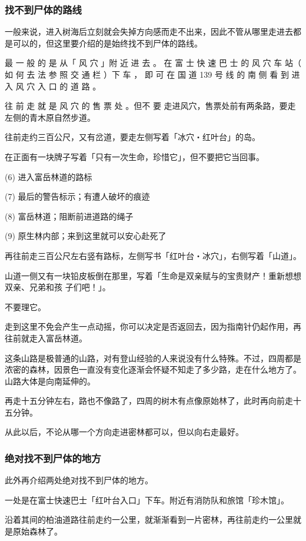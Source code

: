 \documentclass[UTF8]{ctexart}
\begin{document}
\subsubsection*{找不到尸体的路线}

一般来说，进入树海后立刻就会失掉方向感而走不出来，因此不管从哪里走进去都是可以的，但这里要介绍的是始终找不到尸体的路线。

最 一 般 的 是 从「 风 穴 」附 近 进 去 。
在 富 士 快 速 巴 士 的 风 穴 车 站（ 如 何 去 法 参 照 交 通 栏 ）下 车 ， 即 可 在 国 道 139 号 线 的 南 侧 看 到 进 入 风 穴 入 口 的 道 路 。

往 前 走 就 是 风 穴 的 售 票 处 。但不 要 走进风穴，售票处前有两条路，要走左侧的青木原自然步道。 

往前走约三百公尺，又有岔道，要走左侧写着「冰穴‧红叶台」的岛。

在正面有一块牌子写着「只有一次生命，珍惜它」，但不要把它当回事。

(6) 进入富岳林道的路标

(7) 最后的警告标示；有遭人破坏的痕迹

(8) 富岳林道；阻断前进道路的绳子

(9) 原生林内部；来到这里就可以安心赴死了

再往前走三百公尺左右竖有路标，左侧写书「红叶台‧冰穴」，右侧写着「山道」。

山道一侧又有一块铅皮板倒在那里，写着「生命是双亲赋与的宝贵财产！重新想想双亲、兄弟和孩
子们吧！」。

不要理它。

走到这里不免会产生一点动摇，你可以决定是否返回去，因为指南针仍起作用，再往前就走入富岳林道。

这条山路是极普通的山路，对有登山经验的人来说没有什么特殊。不过，四周都是浓密的森林，因景色一直没有变化逐渐会怀疑不知走了多少路，走在什么地方了。山路大体是向南延伸的。

再走十五分钟左右，路也不像路了，四周的树木有点像原始林了，此时再向前走十五分钟。

从此以后，不论从哪一个方向走进密林都可以，但以向右走最好。

\subsubsection*{绝对找不到尸体的地方}

此外再介绍两处绝对找不到尸体的地方。

一处是在富士快速巴士「红叶台入口」下车。附近有消防队和旅馆「珍木馆」。

沿着其间的柏油道路往前走约一公里，就渐渐看到一片密林，再往前走约一公里就是原始森林了。
\end{document}
